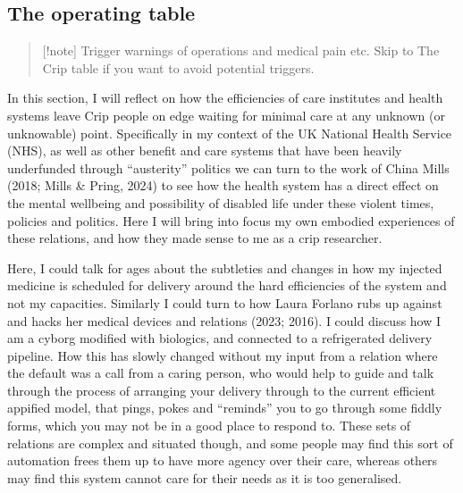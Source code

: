 \hypertarget{the-operating-table}{%
\subsection{The operating table}\label{the-operating-table}}

\begin{quote}
{[}!note{]} Trigger warnings of operations and medical pain etc. Skip to
The Crip table if you want to avoid potential triggers.
\end{quote}

In this section, I will reflect on how the efficiencies of care
institutes and health systems leave Crip people on edge waiting for
minimal care at any unknown (or unknowable) point. Specifically in my
context of the UK National Health Service (NHS), as well as other
benefit and care systems that have been heavily underfunded through
``austerity'' politics we can turn to the work of China Mills (2018;
Mills \& Pring, 2024) to see how the health system has a direct effect
on the mental wellbeing and possibility of disabled life under these
violent times, policies and politics. Here I will bring into focus my
own embodied experiences of these relations, and how they made sense to
me as a crip researcher.

Here, I could talk for ages about the subtleties and changes in how my
injected medicine is scheduled for delivery around the hard efficiencies
of the system and not my capacities. Similarly I could turn to how Laura
Forlano rubs up against and hacks her medical devices and relations
(2023; 2016). I could discuss how I am a cyborg modified with biologics,
and connected to a refrigerated delivery pipeline. How this has slowly
changed without my input from a relation where the default was a call
from a caring person, who would help to guide and talk through the
process of arranging your delivery through to the current efficient
appified model, that pings, pokes and ``reminds'' you to go through some
fiddly forms, which you may not be in a good place to respond to. These
sets of relations are complex and situated though, and some people may
find this sort of automation frees them up to have more agency over
their care, whereas others may find this system cannot care for their
needs as it is too generalised.

